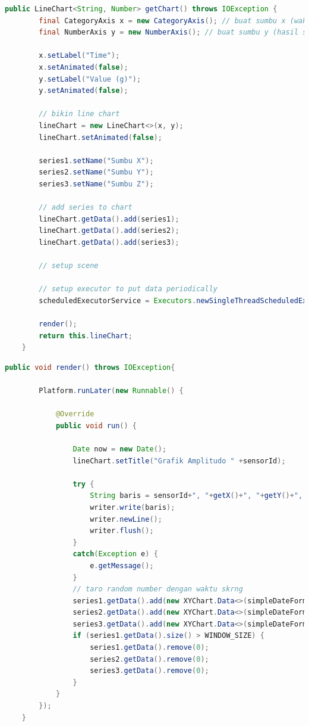 \begin{lstlisting}[language=Java, caption=Metode getChart() (ChartAmplitude), label=getChartAmplitude]
    public LineChart<String, Number> getChart() throws IOException {
        final CategoryAxis x = new CategoryAxis(); // buat sumbu x (waktu)
        final NumberAxis y = new NumberAxis(); // buat sumbu y (hasil sensor)

        x.setLabel("Time");
        x.setAnimated(false);
        y.setLabel("Value (g)");
        y.setAnimated(false);

        // bikin line chart
        lineChart = new LineChart<>(x, y);
        lineChart.setAnimated(false);

        series1.setName("Sumbu X");
        series2.setName("Sumbu Y");
        series3.setName("Sumbu Z");
        
        // add series to chart
        lineChart.getData().add(series1);
        lineChart.getData().add(series2);
        lineChart.getData().add(series3);

        // setup scene

        // setup executor to put data periodically
        scheduledExecutorService = Executors.newSingleThreadScheduledExecutor();

        render();
        return this.lineChart;
    }
\end{lstlisting}

\begin{lstlisting}[language=Java, caption=Metode render() (ChartAmplitude), label=renderAmplitude]
    public void render() throws IOException{
    	
    	Platform.runLater(new Runnable() {
			
			@Override
			public void run() {

		    	Date now = new Date();
		        lineChart.setTitle("Grafik Amplitudo " +sensorId);
		        
		        try {
					String baris = sensorId+", "+getX()+", "+getY()+", "+getZ();
					writer.write(baris);
					writer.newLine();
					writer.flush();
				}
				catch(Exception e) {
					e.getMessage();
				}
		        // taro random number dengan waktu skrng
		        series1.getData().add(new XYChart.Data<>(simpleDateFormat.format(now), getX()));
		        series2.getData().add(new XYChart.Data<>(simpleDateFormat.format(now), getY()));
		        series3.getData().add(new XYChart.Data<>(simpleDateFormat.format(now), getZ()));
		        if (series1.getData().size() > WINDOW_SIZE) {
		            series1.getData().remove(0);
		            series2.getData().remove(0);
		            series3.getData().remove(0);
		        }
			}
		});
    }
\end{lstlisting}

